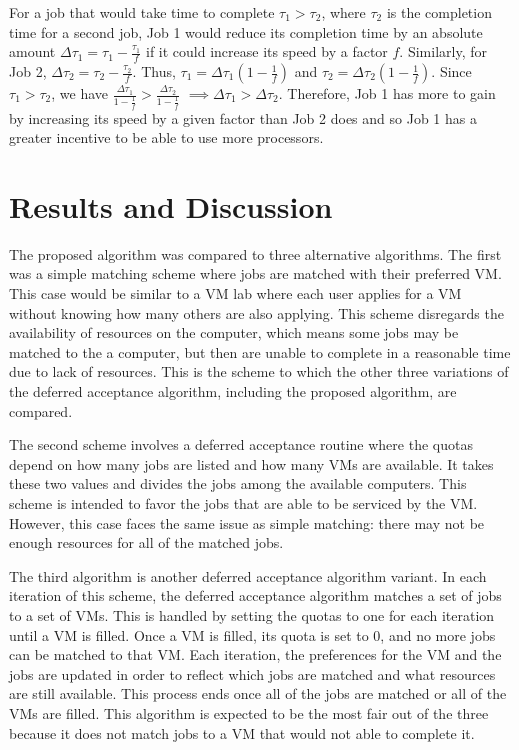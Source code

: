 \documentclass[conference]{IEEEtran}
\begin{document}
For a job that would take time to complete 
\(\tau_1 > \tau_2\), where \(\tau_2\) is the
completion time for a second job,
Job 1 would reduce its completion time by an 
absolute amount 
\(\Delta \tau_1 = \tau_1-\frac{\tau_1}{f}\) 
if it could increase its speed by a factor \(f\).
Similarly, for Job 2, 
\(\Delta \tau_2 = \tau_2-\frac{\tau_2}{f}\).
Thus, 
\(\tau_1=\Delta \tau_1(1-\frac{1}{f})\)
and
\(\tau_2=\Delta \tau_2(1-\frac{1}{f})\).
Since 
\(\tau_1 > \tau_2\), we have
\(\frac{\Delta\tau_1}{1-\frac{1}{f}} > \frac{\Delta\tau_2}{1-\frac{1}{f}}\) 
\(\implies \Delta \tau_1 > \Delta \tau_2\).
Therefore, Job 1 has more to gain by increasing its speed by 
a given factor than Job 2 does and so Job 1 has a greater incentive
to be able to use more processors.




\section{Results and Discussion}
\label{sec:results}
The proposed algorithm was compared to three alternative algorithms.  
The first was a simple matching scheme where jobs are matched with their preferred VM.  
This case would be similar to a VM lab where each user applies for a VM without knowing how many others are also applying.
This scheme disregards the availability of resources on the computer, which means some jobs may be matched to the a computer, but then are unable to complete in a reasonable time due to lack of resources.  
This is the scheme to which the other three variations of the deferred acceptance algorithm, including the proposed algorithm, are compared.

The second scheme involves a deferred acceptance routine where the quotas depend on how many jobs are listed and how many VMs are available.  
It takes these two values and divides the jobs among the available computers.  
This scheme is intended to favor the jobs that are able to be serviced by the VM.  
However, this case faces the same issue as simple matching: there may not be enough resources for all of the matched jobs.  

The third algorithm is another deferred acceptance algorithm variant.  
In each iteration of this scheme, the deferred acceptance algorithm matches a set of jobs to a set of VMs.
This is handled by setting the quotas to one for each iteration until a VM is filled.  
Once a VM is filled, its quota is set to 0, and no more jobs can be matched to that VM.  
Each iteration, the preferences for the VM and the jobs are updated in order to reflect which jobs are matched and what resources are still available.  
This process ends once all of the jobs are matched or all of the VMs are filled.  
This algorithm is expected to be the most fair out of the three because it does not match jobs to a VM that would not able to complete it.
  
\end{document}
